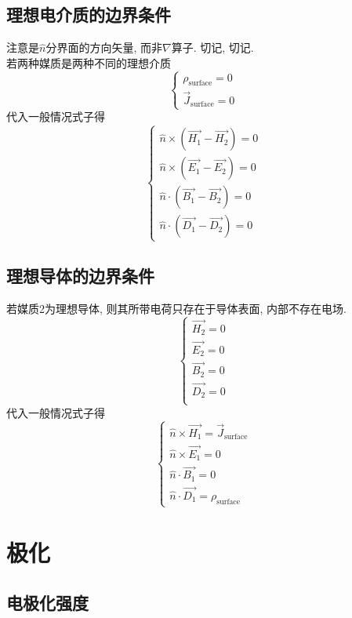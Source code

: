 \documentclass[a4paper]{report}
\begin{document}
\subsection{理想电介质的边界条件}
注意是$\hat{n}$分界面的方向矢量, 而非$\nabla$算子. 切记, 切记. \\
若两种媒质是两种不同的理想介质
$$\begin{cases}
    \rho_{\text{surface}}=0\\
    \vec{J}_{\text{surface}}=0
\end{cases}$$
代入一般情况式子得
$$\begin{cases}
    \hat{n}\times (\vec{H_1}-\vec{H _2}  )=0\\
    \hat{n}\times(\vec{E _1}-\vec{E _2}  )=0\\
    \hat{n}\cdot(\vec{B _1}-\vec{B _2}  )=0\\
    \hat{n}\cdot(\vec{D _1}-\vec{D _2}  )=0
\end{cases}$$
\subsection{理想导体的边界条件}
若媒质2为理想导体, 则其所带电荷只存在于导体表面, 内部不存在电场. 
$$\begin{cases}
    \vec{H _2}=0\\ 
    \vec{E _2}=0\\
    \vec{B _2}=0\\ 
    \vec{D _2}=0\\ 
\end{cases}$$
代入一般情况式子得
$$\begin{cases}
    \hat{n}\times \vec{H _1}=\vec{J}_{\text{surface}}\\
    \hat{n}\times \vec{E _1}=0\\
    \hat{n} \cdot \vec{B _1}=0\\
    \hat{n} \cdot \vec{D _1}=\rho_{\text{surface}}   
\end{cases}$$

\section{极化}
\subsection{电极化强度}
\end{document}
